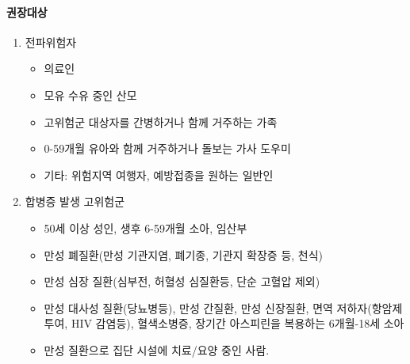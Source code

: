 \paragraph{권장대상}
\begin{enumerate}\tightlist
\item 전파위험자
	\begin{itemize}\tightlist
	\item 의료인
	\item 모유 수유 중인 산모
	\item 고위험군 대상자를 간병하거나 함께 거주하는 가족
	\item 0-59개월 유아와 함께 거주하거나 돌보는 가사 도우미
	\item 기타: 위험지역 여행자, 예방접종을 원하는 일반인
	\end{itemize}	
\item 합병증 발생 고위험군
	\begin{itemize}\tightlist
	\item 50세 이상 성인, 생후 6-59개월 소아, 임산부
	\item 만성 폐질환(만성 기관지염, 폐기종, 기관지 확장증 등, 천식)
	\item 만성 심장 질환(심부전, 허혈성 심질환등, 단순 고혈압 제외)
	\item 만성 대사성 질환(당뇨병등), 만성 간질환, 만성 신장질환, 면역 저하자(항암제 투여, HIV 감염등), 혈색소병증, 장기간 아스피린을 복용하는 6개월-18세 소아
	\item 만성 질환으로 집단 시설에 치료/요양 중인 사람.
	\end{itemize}
\end{enumerate}		

